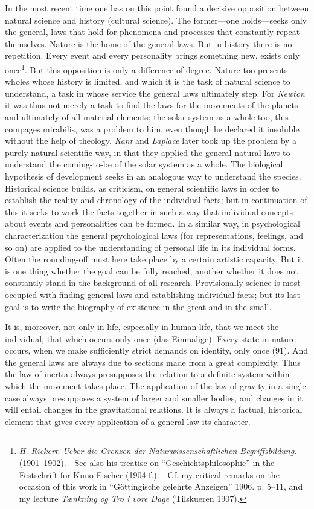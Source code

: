 \documentclass[12pt,a4paper]{book}
\newcommand{\opage}[1]{\marginnote{\footnotesize\textit{[#1]}}}
\begin{document}
In the most recent time one has on this point found a decisive opposition
between natural science and history (cultural science). The former---one
holds---seeks only the general, laws that hold for phenomena and processes
that constantly repeat themselves. Nature is the home of the general laws. But
in history there is no repetition. Every event and every personality brings
something new, exists only once\footnote{\emph{H. Rickert}: \emph{Ueber die
Grenzen der Naturwissenschaftlichen Begriffsbildung}. (1901--1902).---See also
his treatise on ``Geschichtsphilosophie'' in the Festschrift for Kuno Fischer
(1904 f.).---Cf. my critical remarks on the occasion of this work in
``Göttingische gelehrte Anzeigen'' 1906. p. 5--11, and my lecture \emph{Tænkning
og Tro i vore Dage} (Tilskueren 1907).}. But this opposition is only a
difference of degree. Nature too presents wholes whose history is limited, \opage{225}and
which it is the task of natural science to understand, a task in whose service
the general laws ultimately step. For \emph{Newton} it was thus not merely a
task to find the laws for the movements of the planets---and ultimately of all
material elements; the solar system as a whole too, this compages mirabilis,
was a problem to him, even though he declared it insoluble without the help of
theology. \emph{Kant} and \emph{Laplace} later took up the problem by a purely
natural-scientific way, in that they applied the general natural laws to
understand the coming-to-be of the solar system as a whole. The biological
hypothesis of development seeks in an analogous way to understand the species.
Historical science builds, as criticism, on general scientific laws in order
to establish the reality and chronology of the individual facts; but in
continuation of this it seeks to work the facts together in such a way that
individual-concepts about events and personalities can be formed. In a similar
way, in psychological characterization the general psychological laws (for
representations, feelings, and so on) are applied to the understanding of
personal life in its individual forms. Often the rounding-off must here take
place by a certain artistic capacity. But it is one thing whether the goal can
be fully reached, another whether it does not constantly stand in the
background of all research. Provisionally science is most occupied with
finding general laws and establishing individual facts; but its last goal is
to write the biography of existence in the great and in the small.

It is, moreover, not only in life, especially in human life, that we meet the
individual, that which occurs only once (das Einmalige). Every state in nature
occurs, when we make sufficiently strict demands on identity, only once (91).
And the general laws are always due to sections made from a great complexity.
Thus the law of inertia always presupposes the relation to a definite system
within which the movement takes place. The application of the law of gravity
in a single case always presupposes a system of larger and smaller bodies,
and changes in it will entail changes in the gravitational relations. It is
\opage{226}always a factual, historical element that gives every application of a general
law its character.
\end{document}
